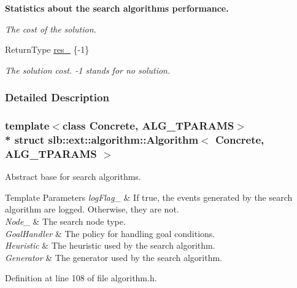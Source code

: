 \begin{Indent}{\bf Statistics about the search algorithm\textquotesingle{}s performance.}
\begin{DoxyCompactItemize}
\begin{DoxyCompactList}\small\item\em The cost of the solution. \end{DoxyCompactList}\item 
Return\+Type \hyperlink{structslb_1_1ext_1_1algorithm_1_1Algorithm_ac01ce5a7230cbc835507bfc00d37fe5d}{res\+\_\+} \{-\/1\}\hypertarget{structslb_1_1ext_1_1algorithm_1_1Algorithm_ac01ce5a7230cbc835507bfc00d37fe5d}{}\label{structslb_1_1ext_1_1algorithm_1_1Algorithm_ac01ce5a7230cbc835507bfc00d37fe5d}

\begin{DoxyCompactList}\small\item\em The solution cost. -\/1 stands for no solution. \end{DoxyCompactList}\end{DoxyCompactItemize}
\end{Indent}


\subsubsection{Detailed Description}
\subsubsection*{template$<$class Concrete, A\+L\+G\+\_\+\+T\+P\+A\+R\+A\+MS$>$\\*
struct slb\+::ext\+::algorithm\+::\+Algorithm$<$ Concrete, A\+L\+G\+\_\+\+T\+P\+A\+R\+A\+M\+S $>$}

Abstract base for search algorithms. 


\begin{DoxyTemplParams}{Template Parameters}
{\em log\+Flag\+\_\+} & If {\ttfamily true}, the events generated by the search algorithm are logged. Otherwise, they are not. \\
\hline
{\em Node\+\_\+} & The search node type. \\
\hline
{\em Goal\+Handler} & The policy for handling goal conditions. \\
\hline
{\em Heuristic} & The heuristic used by the search algorithm. \\
\hline
{\em Generator} & The generator used by the search algorithm. \\
\hline
\end{DoxyTemplParams}


Definition at line 108 of file algorithm.\+h.



